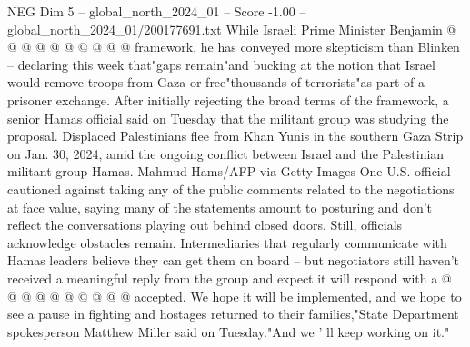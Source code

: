 \begin{textsample}{NEG Dim 5 – global\_north\_2024\_01 – Score -1.00 – global\_north\_2024\_01/200177691.txt}
While Israeli Prime Minister Benjamin @ @ @ @ @ @ @ @ @ @ framework, he has conveyed more skepticism than Blinken -- declaring this week that"gaps remain"and bucking at the notion that Israel would remove troops from Gaza or free"thousands of terrorists"as part of a prisoner exchange.
After initially rejecting the broad terms of the framework, a senior Hamas official said on Tuesday that the militant group was studying the proposal.
Displaced Palestinians flee from Khan Yunis in the southern Gaza Strip on Jan. 30, 2024, amid the ongoing conflict between Israel and the Palestinian militant group Hamas.
Mahmud Hams/AFP via Getty Images One U.S. official cautioned against taking any of the public comments related to the negotiations at face value, saying many of the statements amount to posturing and don't reflect the conversations playing out behind closed doors.
Still, officials acknowledge obstacles remain.
Intermediaries that regularly communicate with Hamas leaders believe they can get them on board -- but negotiators still haven't received a meaningful reply from the group and expect it will respond with a @ @ @ @ @ @ @ @ @ @ accepted.
We hope it will be implemented, and we hope to see a pause in fighting and hostages returned to their families,"State Department spokesperson Matthew Miller said on Tuesday."And we ' ll keep working on it."

\end{textsample}
